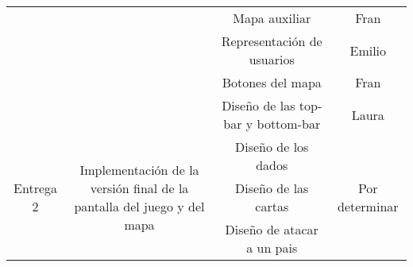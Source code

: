 \documentclass[11pt, a4paper, titlepage]{article}
\begin{document}
\begin{landscape}
\begin{table}[hbt!]
\begin{tabular}{c|ccll|cc|}
\multicolumn{1}{|c|}{}                            & \multicolumn{1}{c|}{}                                                                                           & \multicolumn{3}{c|}{Mapa auxiliar}                                                                             & \multicolumn{2}{c|}{Fran}                                                    \\ \cline{3-7}
\multicolumn{1}{|c|}{}                            & \multicolumn{1}{c|}{}                                                                                           & \multicolumn{3}{c|}{Representación de usuarios}                                                                & \multicolumn{2}{c|}{Emilio}                                                  \\ \cline{3-7}
\multicolumn{1}{|c|}{}                            & \multicolumn{1}{c|}{}                                                                                           & \multicolumn{3}{c|}{Botones del mapa}                                                                          & \multicolumn{2}{c|}{Fran}                                                    \\ \cline{3-7}
\multicolumn{1}{|c|}{}                            & \multicolumn{1}{c|}{}                                                                                           & \multicolumn{3}{c|}{Diseño de las top-bar y bottom-bar}                                                        & \multicolumn{2}{c|}{Laura}                                                   \\ \hline
\multicolumn{1}{|c|}{\multirow{22}{*}{Entrega 2}} & \multicolumn{1}{c|}{\multirow{8}{*}{Implementación de la versión final de la pantalla del juego y del mapa}}    & \multicolumn{3}{c|}{Diseño de los dados}                                                                       & \multicolumn{2}{c|}{\multirow{22}{*}{Por determinar}}                        \\ \cline{3-5}
\multicolumn{1}{|c|}{}                            & \multicolumn{1}{c|}{}                                                                                           & \multicolumn{3}{c|}{Diseño de las cartas}                                                                      & \multicolumn{2}{c|}{}                                                        \\ \cline{3-5}
\multicolumn{1}{|c|}{}                            & \multicolumn{1}{c|}{}                                                                                           & \multicolumn{3}{c|}{Diseño de atacar a un pais}                                                                & \multicolumn{2}{c|}{}                                                        \\ \cline{3-5}

\end{tabular}
\end{table}
\end{landscape}
\end{document}
